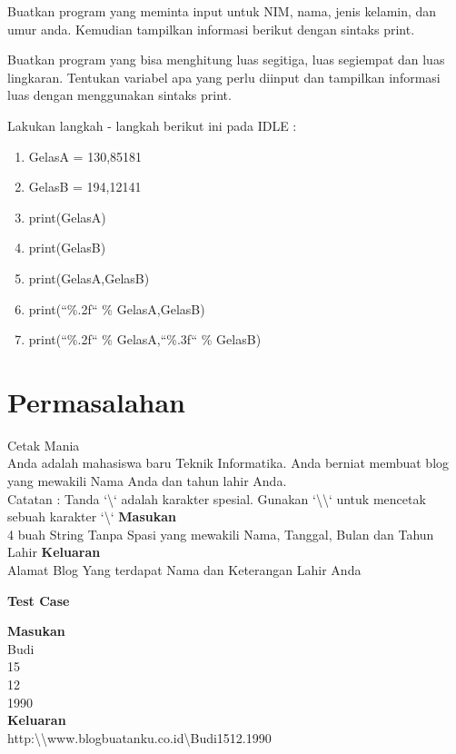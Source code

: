 \begin{latihan}
Buatkan program yang meminta input untuk NIM, nama, jenis kelamin, dan umur anda. Kemudian tampilkan informasi berikut dengan sintaks print.
\end{latihan}

\begin{latihan}
Buatkan program yang bisa menghitung luas segitiga, luas segiempat dan luas lingkaran. Tentukan variabel apa yang perlu diinput dan tampilkan informasi luas dengan menggunakan sintaks print.
\end{latihan}

\begin{latihan}
\label{latihan:Gelas}
Lakukan langkah - langkah berikut ini pada IDLE : 
\begin{enumerate}
	\item GelasA = 130,85181
	\item GelasB = 194,12141
	\item print(GelasA)
	\item print(GelasB)
	\item print(GelasA,GelasB)
	\item print(``\%.2f`` \% GelasA,GelasB)
	\item print(``\%.2f`` \% GelasA,``\%.3f`` \% GelasB)
\end{enumerate}
\end{latihan}


\section{Permasalahan}
\begin{permasalahan}{Cetak Mania}\\
\label{prob:CetakMania}
	Anda adalah mahasiswa baru Teknik Informatika. Anda berniat membuat blog yang mewakili Nama Anda dan tahun lahir Anda.\\
Catatan : Tanda `\textbackslash` adalah karakter spesial. Gunakan `\textbackslash\textbackslash` untuk mencetak sebuah karakter `\textbackslash`
	\textbf{Masukan}\\
	4 buah String Tanpa Spasi yang mewakili Nama, Tanggal, Bulan dan Tahun Lahir
	\textbf{Keluaran}\\
	Alamat Blog Yang terdapat Nama dan Keterangan Lahir Anda
	\begin{center}
	\textbf{Test Case}\\
	\end{center}
	\textbf{Masukan}\\
	Budi \\
	15 \\
	12 \\
	1990 \\
	\textbf{Keluaran}\\
	http:\textbackslash\textbackslash www.blogbuatanku.co.id\textbackslash Budi1512.1990 \\	
\end{permasalahan}


